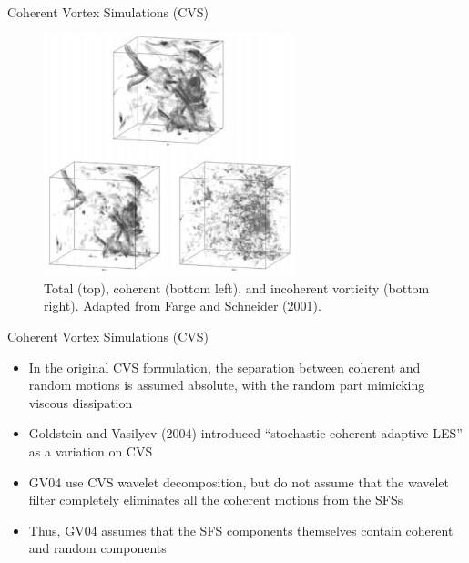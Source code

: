 
\begin{frame}{Coherent Vortex Simulations (CVS)}
\begin{figure}
	\includegraphics[width=0.65\textwidth]{cvs3}
	\caption{Total (top), coherent (bottom left), and incoherent vorticity (bottom right). Adapted from Farge and Schneider (2001).}
\end{figure}
\end{frame}


\begin{frame}{Coherent Vortex Simulations (CVS)}

\begin{itemize}
	\item In the original CVS formulation, the separation between coherent and random motions is assumed absolute, with the random part mimicking viscous dissipation
	\item Goldstein and Vasilyev (2004) introduced ``stochastic coherent  adaptive LES'' as a variation on CVS
	\item GV04 use CVS wavelet decomposition, but do not assume that the wavelet filter completely eliminates all the coherent motions from the SFSs
	\item Thus, GV04 assumes that the SFS components themselves contain coherent and random components
\end{itemize}

\end{frame}


